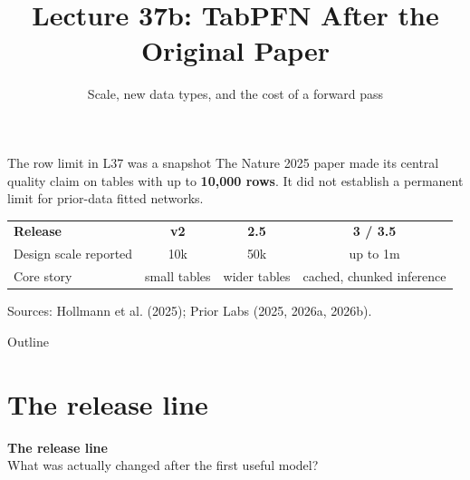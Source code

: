 \documentclass[aspectratio=169]{beamer}
\title{Lecture 37b: TabPFN After the Original Paper}
\subtitle{Scale, new data types, and the cost of a forward pass}
\date{}
\begin{document}
\begin{frame}\titlepage\end{frame}

\begin{frame}{The row limit in L37 was a snapshot}
  \small
  The Nature 2025 paper made its central quality claim on tables with up to
  \textbf{10,000 rows}. It did not establish a permanent limit for prior-data fitted networks.
  \vskip 12pt
  \begin{center}
  \begin{tabular}{lccc}
    \textbf{Release} & \textbf{v2} & \textbf{2.5} & \textbf{3 / 3.5}\\[3pt]
    Design scale reported & 10k & 50k & up to 1m\\
    Core story & small tables & wider tables & cached, chunked inference
  \end{tabular}
  \end{center}
  \vskip 10pt
  \vskip 5pt
  {\scriptsize Sources: Hollmann et al. (2025); Prior Labs (2025, 2026a, 2026b).}
\end{frame}

\begin{frame}{Outline}\tableofcontents\end{frame}

\section{The release line}
\begin{frame}[plain]
  \vfill\centering
  {\Large\color{popblue}\textbf{The release line}}\\[9pt]
  {\small What was actually changed after the first useful model?}
  \vfill
\end{frame}
\end{document}

